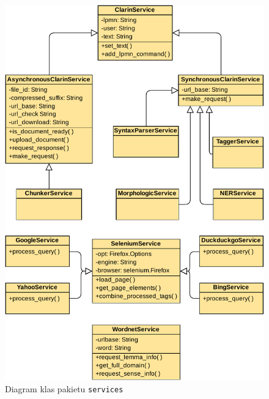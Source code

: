 \begin{figure}[h]
    \centering
    \includegraphics[width=\columnwidth]{figures/WEDT-Klasy.pdf}
    \caption{Diagram klas pakietu \texttt{services}}
    \label{fig:services-classes}
\end{figure}
